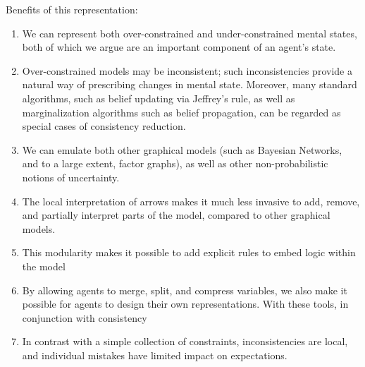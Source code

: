 \documentclass{article}
\begin{document}
	Benefits of this representation:
	\begin{enumerate}[nosep]
		\item We can represent both over-constrained and under-constrained mental states, both of which we argue are an important component of an agent's state.
		\item Over-constrained models may be inconsistent; such inconsistencies provide a natural way of prescribing changes in mental state. Moreover, many standard algorithms, such as belief updating via Jeffrey's rule, as well as marginalization algorithms such as belief propagation, can be regarded as special cases of consistency reduction.
		\item We can emulate both other graphical models (such as Bayesian Networks, and to a large extent, factor graphs), as well as other non-probabilistic notions of uncertainty. 
		\item The local interpretation of arrows makes it much less invasive to add, remove, and partially interpret parts of the model, compared to other graphical models. 
		\item This modularity makes it possible to add explicit rules to embed logic within the model
		\item By allowing agents to merge, split, and compress variables, we also make it possible for agents to design their own representations. With these tools, in conjunction with consistency 
		\item In contrast with a simple collection of constraints, inconsistencies are local, and individual mistakes have limited impact on expectations.
	\end{enumerate} %


	
	
	
	
	

	
\end{document}
